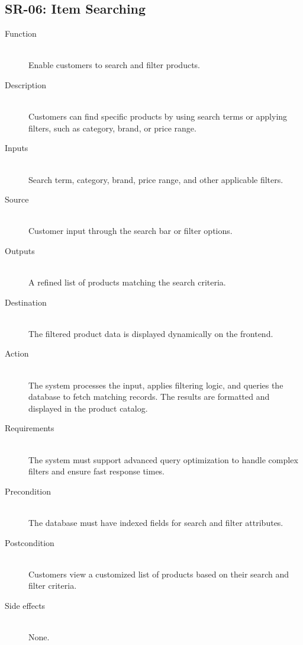\documentclass[a4paper,journal]{IEEEtran}
\begin{document}
\subsection{SR-06: Item Searching}
\begin{description}
  \item[Function] \hfill \\
  Enable customers to
  search and filter products.
  \item[Description] \hfill \\
  Customers can find specific products by using search
  terms or applying filters, such as category, brand, or price range.
  \item[Inputs] \hfill \\
  Search term,
  category, brand, price range, and other applicable filters.
  \item[Source] \hfill \\
  Customer input through the search bar or filter
  options.
  \item[Outputs] \hfill \\
  A refined list of products matching the search
  criteria.
  \item[Destination] \hfill \\
  The filtered product data is displayed dynamically on
  the frontend.
  \item[Action] \hfill \\
  The system processes the input, applies filtering
  logic, and queries the database to fetch matching records. The results are
  formatted and displayed in the product catalog.
  \item[Requirements] \hfill \\
  The system must support advanced query optimization
  to handle complex filters and ensure fast response times.
  \item[Precondition] \hfill \\
  The database must have indexed fields for search and
  filter attributes.
  \item[Postcondition] \hfill \\
  Customers view a customized list of products based on
  their search and filter criteria.
  \item[Side effects] \hfill \\
  None.
\end{description}
\end{document}
